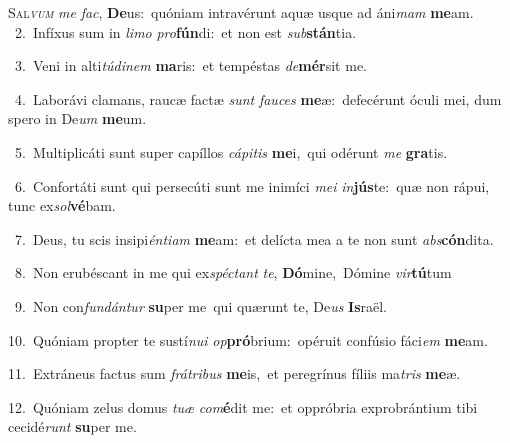 \lettrine{\initial\textcolor{\initialcolor}{S}}{al\-\textit{vum}\-} \textit{me} \textit{fac}\-, \textbf{De}\-us:~\star quóniam intravérunt aquæ usque ad áni\textit{mam} \textbf{me}\-am.\\
{\numbfont\textcolor{\numbcolor}{~2.}}~Infíxus sum in \textit{li}\-\textit{mo} \textit{pro}\-\textbf{fún}di:~\star et non est \textit{sub}\-\textbf{stán}tia.\par
{\numbfont\textcolor{\numbcolor}{~3.}}~Veni in alti\-\textit{tú}\-\textit{di}\textit{nem} \textbf{ma}\-ris:~\star et tempéstas \textit{de}\-\textbf{mér}sit me.\par
{\numbfont\textcolor{\numbcolor}{~4.}}~Laborávi clamans, raucæ factæ \textit{sunt} \textit{fau}\-\textit{ces} \textbf{me}\-æ:~\star defecérunt óculi mei, dum spero in De\textit{um} \textbf{me}\-um.\par
{\numbfont\textcolor{\numbcolor}{~5.}}~Multiplicáti sunt super capíllos \textit{cá}\-\textit{pi}\textit{tis} \textbf{me}\-i,~\star qui odérunt \textit{me} \textbf{gra}\-tis.\par
{\numbfont\textcolor{\numbcolor}{~6.}}~Confortáti sunt qui persecúti sunt me inimíci \textit{me}\-\textit{i} \textit{in}\-\textbf{jús}te:~\star quæ non rápui, tunc ex\-\textit{sol}\-\textbf{vé}bam.\par
{\numbfont\textcolor{\numbcolor}{~7.}}~Deus, tu scis insipi\-\textit{én}\-\textit{ti}\textit{am} \textbf{me}\-am:~\star et delícta mea a te non sunt \textit{abs}\-\textbf{cón}dita.\par
{\numbfont\textcolor{\numbcolor}{~8.}}~Non erubéscant in me qui ex\-\textit{spéc}\-\textit{tant} \textit{te}\-, \textbf{Dó}\-mine,~\star Dómine \textit{vir}\-\textbf{tú}tum\par
{\numbfont\textcolor{\numbcolor}{~9.}}~Non con\-\textit{fun}\-\textit{dán}\textit{tur} \textbf{su}\-per me~\star qui quærunt te, De\textit{us} \textbf{Is}\-raël.\par
{\numbfont\textcolor{\numbcolor}{10.}}~Quóniam propter te sustí\-\textit{nu}\-\textit{i} \textit{op}\-\textbf{pró}brium:~\star opéruit confúsio fáci\textit{em} \textbf{me}\-am.\par
{\numbfont\textcolor{\numbcolor}{11.}}~Extráneus factus sum \textit{frá}\-\textit{tri}\textit{bus} \textbf{me}\-is,~\star et peregrínus fíliis ma\textit{tris} \textbf{me}\-æ.\par
{\numbfont\textcolor{\numbcolor}{12.}}~Quóniam zelus domus \textit{tu}\-\textit{æ} \textit{com}\-\textbf{é}dit me:~\star et oppróbria exprobrántium tibi cecidé\textit{runt} \textbf{su}\-per me.\par
